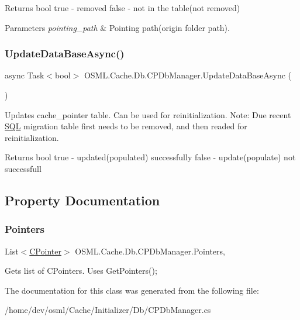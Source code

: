 \begin{DoxyReturn}{Returns}
bool true -\/ removed false -\/ not in the table(not removed) 
\end{DoxyReturn}

\begin{DoxyParams}{Parameters}
{\em pointing\+\_\+path} & Pointing path(origin folder path).\\
\hline
\end{DoxyParams}
\mbox{\label{classOSML_1_1Cache_1_1Db_1_1CPDbManager_aa379e13e88129489f76fd403a21e8f6c}} 
\subsubsection{\texorpdfstring{UpdateDataBaseAsync()}{UpdateDataBaseAsync()}}
{\footnotesize\ttfamily async Task$<$bool$>$ O\+S\+M\+L.\+Cache.\+Db.\+C\+P\+Db\+Manager.\+Update\+Data\+Base\+Async (\begin{DoxyParamCaption}{ }\end{DoxyParamCaption})\hspace{0.3cm}{\ttfamily [inline]}}



Updates cache\+\_\+pointer table. Can be used for reinitialization. Note\+: Due recent \mbox{\hyperlink{namespaceOSML_1_1SQL}{S\+QL}} migration table first needs to be removed, and then readed for reinitialization. 

\begin{DoxyReturn}{Returns}
bool true -\/ updated(populated) successfully false -\/ update(populate) not successfull 
\end{DoxyReturn}


\subsection{Property Documentation}
\mbox{\label{classOSML_1_1Cache_1_1Db_1_1CPDbManager_adabfcee3456023de52c6984935bf1c86}} 
\subsubsection{\texorpdfstring{Pointers}{Pointers}}
{\footnotesize\ttfamily List$<$\mbox{\hyperlink{classOSML_1_1Cache_1_1CPointer}{C\+Pointer}}$>$ O\+S\+M\+L.\+Cache.\+Db.\+C\+P\+Db\+Manager.\+Pointers\hspace{0.3cm}{\ttfamily [static]}, {\ttfamily [get]}}



Gets list of C\+Pointers. Uses Get\+Pointers(); 



The documentation for this class was generated from the following file\+:\begin{DoxyCompactItemize}
\item 
/home/dev/osml/\+Cache/\+Initializer/\+Db/C\+P\+Db\+Manager.\+cs\end{DoxyCompactItemize}
